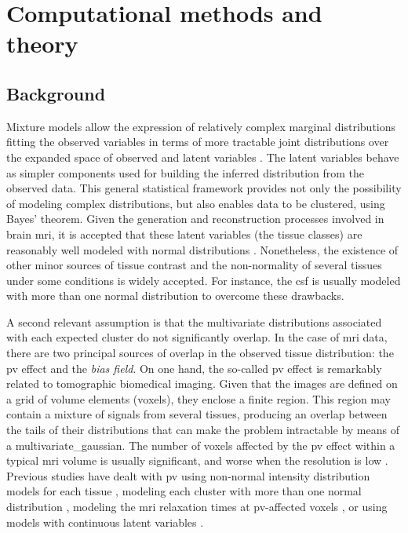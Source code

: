 \section{Computational methods and theory}
\label{sec:methods}

\subsection{Background}
\label{sec:background}

Mixture models allow the expression of relatively complex marginal distributions
  fitting the observed variables in terms of more tractable joint
  distributions over the expanded space of observed and latent variables
  \citep{bishop_pattern_2009}.
The latent variables behave as simpler components used for building
  the inferred distribution from the observed data.
This general statistical framework provides not only the possibility
  of modeling complex distributions, %
  but also enables data to be clustered, using Bayes' theorem.
Given the generation and reconstruction processes involved in brain
  \gls*{mri}, it is accepted that these latent variables (the tissue
  classes) are reasonably well modeled with normal distributions
  \citep{van_leemput_automated_1999-1}.
Nonetheless, the existence of other minor sources of tissue contrast
  and the non-normality of several tissues under some conditions is
  widely accepted.
For instance, the \gls*{csf} is usually modeled with more than one
  normal distribution \citep{van_leemput_automated_1999-1,
  ashburner_unified_2005} to overcome these drawbacks.

A second relevant assumption is that the multivariate
  distributions associated with each expected cluster do
  not significantly overlap.
In the case of \gls*{mri} data, there are two principal sources of
  overlap in the observed tissue distribution: the \gls*{pv} effect and
  the \emph{bias field}.
On one hand, the so-called \gls*{pv} effect is remarkably related to
  tomographic biomedical imaging. Given that the images are defined
  on a grid of volume elements (voxels), they enclose a finite region.
This region may contain a mixture of signals from several
  tissues, producing an overlap between the tails of their distributions
  that can make the problem intractable by means of a
  \gls*{multivariate_gaussian}.
The number of voxels affected by the \gls*{pv} effect within a typical
  \gls*{mri} volume is usually significant, and worse when the resolution
  is low \citep{bromiley_multi-dimensional_2008}.
Previous studies have dealt with \gls*{pv} using non-normal intensity distribution
  models for each tissue \citep{santago_statistical_1995,noe_partial_2001,
  tohka_fast_2004}, modeling each cluster with more than one normal distribution
  \citep{ashburner_unified_2005,cuadra_comparison_2005},
  modeling the \gls*{mri} relaxation times at \gls*{pv}-affected voxels
  \citep{duche_bi-exponential_2012}, or
  using models with continuous latent variables \citep{liang_em_2009}.

